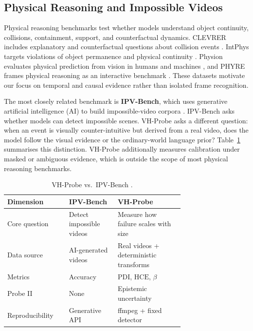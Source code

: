 \documentclass[final,5p,times,twocolumn]{elsarticle}
\newcommand{\PDI}{\mathrm{PDI}}
\newcommand{\HCE}{\mathrm{HCE}}
\begin{document}
\subsection{Physical Reasoning and Impossible Videos}

Physical reasoning benchmarks test whether models understand object continuity,
collisions, containment, support, and counterfactual dynamics. CLEVRER includes
explanatory and counterfactual questions about collision events
\cite{yi2019clevrer}. IntPhys targets violations of object permanence and
physical continuity \cite{riochet2018intphys}. Physion evaluates physical
prediction from vision in humans and machines \cite{bear2021physion}, and
PHYRE frames physical reasoning as an interactive benchmark
\cite{bakhtin2019phyre}. These datasets motivate our focus on temporal and
causal evidence rather than isolated frame recognition.

The most closely related benchmark is \textbf{IPV-Bench}, which uses
generative artificial intelligence (AI) to build impossible-video corpora
\cite{bai2025impossible}. IPV-Bench asks whether models can detect impossible
scenes. VH-Probe asks a different question: when an event is visually
counter-intuitive but derived from a real video, does the model follow the
visual evidence or the ordinary-world language prior? Table~\ref{tab:comparison}
summarises this distinction. VH-Probe additionally measures calibration under
masked or ambiguous evidence, which is outside the scope of most physical
reasoning benchmarks.

\begin{table}[t]
\centering
\small
\caption{VH-Probe vs.\ IPV-Bench \cite{bai2025impossible}.}
\label{tab:comparison}
\begin{tabular}{p{0.20\linewidth}p{0.22\linewidth}p{0.30\linewidth}}
\toprule
\textbf{Dimension} & \textbf{IPV-Bench} & \textbf{VH-Probe} \\
\midrule
Core question   & Detect impossible videos & Measure how failure scales with size \\
Data source     & AI-generated videos & Real videos + deterministic transforms \\
Metrics         & Accuracy & $\PDI$, $\HCE$, $\beta$ \\
Probe II        & None & Epistemic uncertainty \\
Reproducibility & Generative API & ffmpeg + fixed detector \\
\bottomrule
\end{tabular}
\end{table}
\end{document}
